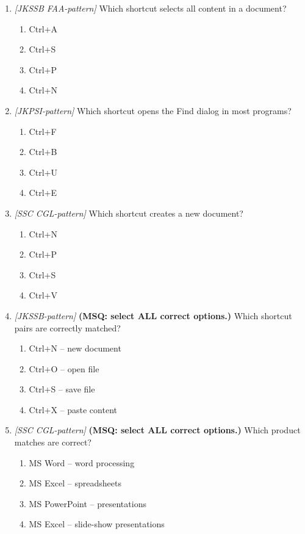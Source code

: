 \documentclass[11pt]{article}
\begin{document}
\begin{enumerate}[label=\textbf{Q\arabic*.}, leftmargin=*]
\item \textit{[JKSSB FAA-pattern]} Which shortcut selects all content in a document?
  \begin{enumerate}[label=\Alph*.]
    \item Ctrl+A
    \item Ctrl+S
    \item Ctrl+P
    \item Ctrl+N
  \end{enumerate}
\item \textit{[JKPSI-pattern]} Which shortcut opens the Find dialog in most programs?
  \begin{enumerate}[label=\Alph*.]
    \item Ctrl+F
    \item Ctrl+B
    \item Ctrl+U
    \item Ctrl+E
  \end{enumerate}
\item \textit{[SSC CGL-pattern]} Which shortcut creates a new document?
  \begin{enumerate}[label=\Alph*.]
    \item Ctrl+N
    \item Ctrl+P
    \item Ctrl+S
    \item Ctrl+V
  \end{enumerate}
\item \textit{[JKSSB-pattern]} \textbf{(MSQ: select ALL correct options.)} Which shortcut pairs are correctly matched?
  \begin{enumerate}[label=\Alph*.]
    \item Ctrl+N -- new document
    \item Ctrl+O -- open file
    \item Ctrl+S -- save file
    \item Ctrl+X -- paste content
  \end{enumerate}
\item \textit{[SSC CGL-pattern]} \textbf{(MSQ: select ALL correct options.)} Which product matches are correct?
  \begin{enumerate}[label=\Alph*.]
    \item MS Word -- word processing
    \item MS Excel -- spreadsheets
    \item MS PowerPoint -- presentations
    \item MS Excel -- slide-show presentations
  \end{enumerate}
\end{enumerate}
\def\JKSSBLessonID{54}\def\JKSSBAnswers{0}
\end{document}
